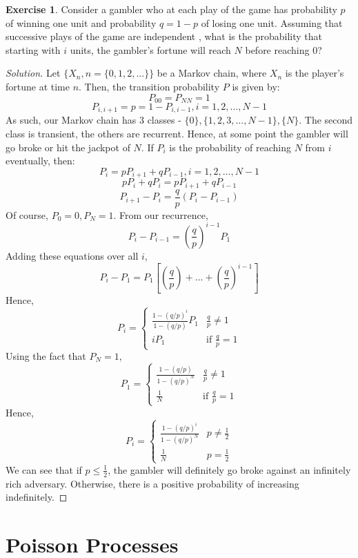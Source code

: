 \documentclass[12pt,letterpaper]{amsbook}
\theoremstyle{definition}
\newtheorem*{exercise}{Exercise}
\newenvironment{solution}
  {\renewcommand\qedsymbol{$\blacksquare$}\begin{proof}[Solution]}
  {\end{proof}}
\begin{document}
\begin{exercise}
  Consider a gambler who at each play of the game has probability $p$ of winning one unit and probability $q=1-p$ of losing one unit. Assuming that successive plays of the game are independent , what is the probability that starting with $i$ units, the gambler's fortune will reach $N$ before reaching 0?  
\end{exercise}
\begin{solution}
  Let $\{X_n,n=\{0,1,2,...\}\}$ be a Markov chain, where $X_n$ is the player's fortune at time $n$. Then, the transition probability $P$ is given by:
  \[P_{00} = P_{NN} = 1\]
  \[P_{i,i+1} = p = 1-P_{i,i-1}, i = 1,2,...,N-1\]
  As such, our Markov chain has 3 classes - $\{0\}, \{1,2,3,...,N-1\}, \{N\}$. The second class is transient, the others are recurrent. Hence, at some point the gambler will go broke or hit the jackpot of $N$.
  If $P_i$ is the probability of reaching $N$ from $i$ eventually, then:
  \[P_i = pP_{i+1} + qP_{i-1}, i = 1,2,...,N-1\]
  \[pP_i + qP_i = pP_{i+1} + qP_{i-1}\]
  \[P_{i+1} - P_i = \frac{q}{p}(P_i - P_{i-1})\]
  Of course, $P_0 = 0, P_N = 1$. From our recurrence, 
  \[P_i - P_{i-1} = \left( \frac{q}{p} \right)^{i-1} P_1\]
  Adding these equations over all $i$,
  \[P_i - P_1 = P_1 \left[\left(\frac{q}{p}\right) + ... + \left(\frac{q}{p} \right)^{i-1}  \right]\]
  Hence, 
  \[P_i = \begin{cases}
    \frac{1-(q/p)^i}{1-(q/p)}P_1 & \frac{q}{p} \neq 1 \\
    iP_1 & \text{if } \frac{q}{p} = 1
  \end{cases}\]
  Using the fact that $P_N = 1$,
  \[P_1 = \begin{cases}
    \frac{1-(q/p)}{1-(q/p)^N} & \frac{q}{p} \neq 1 \\
    \frac{1}{N} & \text{if } \frac{q}{p} = 1
  \end{cases}\]
  Hence,
  \[P_i = \begin{cases}
    \frac{1-(q/p)^i}{1-(q/p)^N} & p \neq \frac{1}{2} \\
    \frac{1}{N} & p = \frac{1}{2}
  \end{cases}\]
  We can see that if $p \leq \frac{1}{2}$, the gambler will definitely go broke against an infinitely rich adversary. Otherwise, there is a positive probability of increasing indefinitely.
\end{solution}

\chapter{Poisson Processes}
\end{document}
